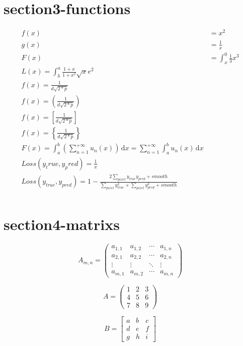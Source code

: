 \documentclass{article}
\begin{document}
\section{section3-functions}
\begin{align}
f(x)  &= x^2 \\
g(x) &= \frac{1}{x}\\
F(x) &= \int^0_x \frac{1}{3}x^3\\
L(x) = \int^a_b \frac{1+x}{1+x^2}\sqrt{x}e^2\\
f(x) = \frac{1}{d \sqrt{2*p}}\\
f(x) = \left( \frac{1}{d \sqrt{2*p}} \right)\\
f(x) = \left[ \frac{1}{d \sqrt{2*p}} \right]\\
f(x) = \left\{ \frac{1}{d \sqrt{2*p}} \right\}\\
F(x) = \int_{a}^{b}\left( \sum_{n=1}^{+\infty}u_{n}(x) \right)\,\mathrm{d}x
    =\sum_{n=1}^{+\infty}\int_{a}^{b}u_{n}(x)\,\mathrm{d}x \\
Loss(y_true, y_pred) = \frac{1}{x}\\
Loss(y_{true}, y_{pred}) = 1 - \frac{2\sum_{pixel}y_{true}y_{pred} + smooth }{\sum_{pixel}y_{true}^2 + \sum_{pixel}y_{pred}^2 + smooth}\\
\end{align}


\section{section4-matrixs}
\begin{equation}
A_{m,n} = 
\begin{pmatrix}
a_{1,1} & a_{1,2} & \cdots & a_{1,n} \\
a_{2,1} & a_{2,2} & \cdots & a_{2,n} \\
\vdots  & \vdots  & \ddots & \vdots  \\
a_{m,1} & a_{m,2} & \cdots & a_{m,n} 
\end{pmatrix}
\end{equation}

\begin{equation}
A = 
\begin{pmatrix}
1 & 2 & 3 \\
4 & 5 & 6 \\
7 & 8 & 9
\end{pmatrix}
\end{equation}

\begin{equation*}
B = 
\begin{bmatrix}
a & b & c \\
d & e & f \\
g & h & i
\end{bmatrix}
\end{equation*}
\end{document}
